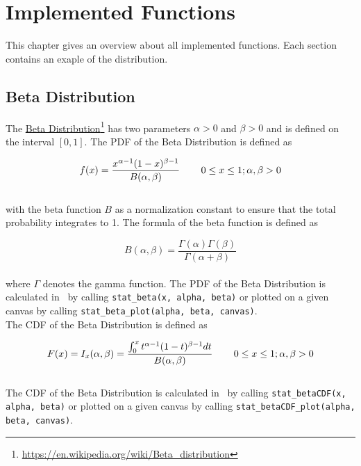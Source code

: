 
\chapter{Implemented Functions}

	This chapter gives an overview about all implemented functions. Each section contains an exaple of the distribution.

	\section{Beta Distribution} \label{sec:beta_distribution}

		The \href{https://en.wikipedia.org/wiki/Beta_distribution}{Beta Distribution}\footnote{\url{https://en.wikipedia.org/wiki/Beta_distribution}} has two parameters $\alpha > 0$ and $\beta > 0$ and is defined on the interval $[0,1]$. The \ac{PDF} of the Beta Distribution is defined as

		$$f(x) = \frac{x^{\alpha-1}(1-x)^{\beta-1}}{B(\alpha,\beta)}  \hspace{.3in} 0 \le x \le 1; \alpha, \beta > 0$$
		\\[0.3cm]		
		with the beta function $B$ as a normalization constant to ensure that the total probability integrates to 1. The formula of the beta function is defined as

		$$B(\alpha,\beta) = \frac{\Gamma(\alpha)\Gamma(\beta)}{\Gamma(\alpha + \beta)}$$
		\\[0.3cm]
		where $\Gamma$ denotes the gamma function. The \ac{PDF} of the Beta Distribution is calculated in \setlx\ by calling \lstinline{stat_beta(x, alpha, beta)} or plotted on a given canvas by calling \lstinline{stat_beta_plot(alpha, beta, canvas)}.
		\\[0.3cm]		
		The \ac{CDF} of the Beta Distribution is defined as

		$$F(x) = I_{x}(\alpha,\beta) = \frac{\int_{0}^{x}{t^{\alpha-1}(1-t)^{\beta-1}dt}}{B(\alpha,\beta)} \hspace{.3in} 0 \le x \le 1; \alpha, \beta > 0$$
		\\[0.3cm]
		The \ac{CDF} of the Beta Distribution is calculated in \setlx\ by calling \lstinline{stat_betaCDF(x, alpha, beta)} or plotted on a given canvas by calling \lstinline{stat_betaCDF_plot(alpha, beta, canvas)}.

